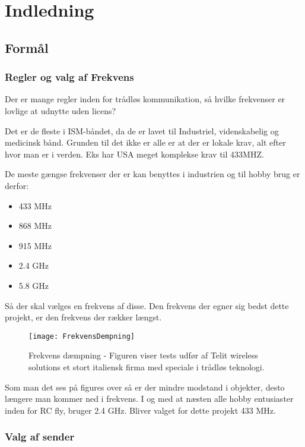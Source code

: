 \documentclass[Main]{subfiles}
\begin{document}
\chapter{Indledning}

\section{Formål}


\subsection{Regler og valg af Frekvens}
Der er mange regler inden for trådløs kommunikation, så hvilke frekvenser er lovlige at udnytte uden licens?

Det er de fleste i ISM-båndet, da de er lavet til  Industriel, videnskabelig og medicinsk bånd. Grunden til det ikke er alle er at der er lokale krav, alt efter hvor man er i verden. Eks har USA meget komplekse krav til 433MHZ.\cite[s. 32]{Lov1}

De meste gængse frekvenser der er kan benyttes i industrien og til hobby brug er derfor:

\begin{itemize}
\item 433 MHz
\item 868 MHz
\item 915 MHz
\item 2.4 GHz
\item 5.8 GHz
\end{itemize}

Så der skal vælges en frekvens af disse.
Den frekvens der egner sig bedst dette projekt, er den frekvens der rækker længst. 

\begin{figure}[H]
\centering
\texttt{[image: FrekvensDempning]}
\caption{Frekvens dæmpning - Figuren viser tests udfør af Telit wireless solutions et stort italiensk firma med speciale i trådløs teknologi.}
\end{figure}




Som man det ses på figures over så er der mindre modstand i objekter, desto længere man kommer ned i frekvens.
I og med at næsten alle hobby entusiaster inden for RC fly, bruger 2.4 GHz. 
Bliver valget for dette projekt 433 MHz.

\subsection{Valg af sender}
\end{document}
